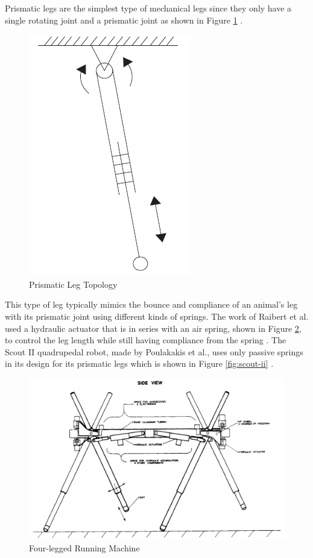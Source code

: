 \documentclass[english]{upeeei}
\begin{document}
Prismatic legs are the simplest type of mechanical legs since they only have a single rotating joint and a prismatic joint as shown in Figure \ref{fig:prismatic-leg} \cite{quadrobotlegs}. 

\begin{figure}[H]
\begin{centering}
\includegraphics[width=0.3\columnwidth]{images/prismatic_leg}
\par\end{centering}
\caption{Prismatic Leg Topology\label{fig:prismatic-leg}}
\end{figure}

This type of leg typically mimics the bounce and compliance of an animal's leg with its prismatic joint using different kinds of springs. The work of Raibert et al. used a hydraulic actuator that is in series with an air spring, shown in Figure \ref{fig:quad-running-robot}, to control the leg length while still having compliance from the spring \cite{quadrunningrobot}. The Scout II quadrupedal robot, made by Poulakakis et al., uses only passive springs in its design for its prismatic legs which is shown in Figure \ref{fig:scout-ii} \cite{quadrobotlegs, scoutii}.

\begin{figure}[H]
\begin{centering}
\includegraphics[width=0.75\columnwidth]{images/quad_running_robot}
\par\end{centering}
\caption{Four-legged Running Machine\label{fig:quad-running-robot}}
\end{figure}
\end{document}
